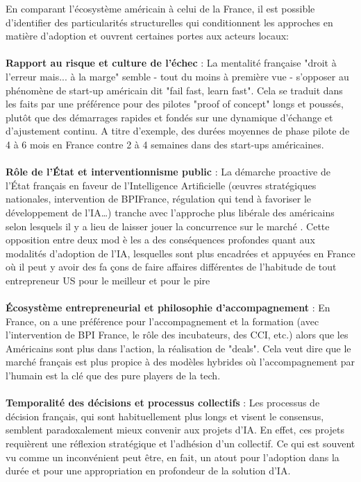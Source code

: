 En comparant l'écosystème américain à celui de la France, il est possible d'identifier des particularités structurelles qui conditionnent les approches en matière d'adoption et ouvrent certaines portes aux acteurs locaux:
\\\\
\textbf{Rapport au risque et culture de l'échec} : La mentalité française "droit à l'erreur mais... à la marge" semble - tout du moins à première vue - s'opposer au phénomène de start-up américain dit "fail fast, learn fast"\cite{meyer2014culture}. Cela se traduit dans les faits par une préférence pour des pilotes "proof of concept" longs et poussés, plutôt que des démarrages rapides et fondés sur une dynamique d'échange et d'ajustement continu. A titre d'exemple, des durées moyennes de phase pilote de 4 à 6 mois en France contre 2 à 4 semaines dans des start-ups américaines.
\\\\
\textbf{Rôle de l'État et interventionnisme public} : La démarche proactive de l’État français en faveur de l’Intelligence Artificielle (œuvres stratégiques nationales, intervention de BPIFrance, régulation qui tend à favoriser le développement de l’IA…) tranche avec l’approche plus libérale des américains selon lesquels il y a lieu de laisser jouer la concurrence sur le marché \cite{france_strategie2025make}. Cette opposition entre deux mod è les a des conséquences profondes quant aux modalités d’adoption de l’IA, lesquelles sont plus encadrées et appuyées en France où il peut y avoir des fa çons de faire affaires différentes de l’habitude de tout entrepreneur US pour le meilleur et pour le pire
\\\\
\textbf{Écosystème entrepreneurial et philosophie d'accompagnement} : En France, on a une préférence pour l'accompagnement et la formation (avec l'intervention de BPI France, le rôle des incubateurs, des CCI, etc.) alors que les Américains sont plus dans l'action, la réalisation de "deals". Cela veut dire que le marché français est plus propice à des modèles hybrides où l'accompagnement par l'humain est la clé que des pure players de la tech.
\\\\
\textbf{Temporalité des décisions et processus collectifs} : Les processus de décision français, qui sont habituellement plus longs et visent le consensus, semblent paradoxalement mieux convenir aux projets d’IA. En effet, ces projets requièrent une réflexion stratégique et l’adhésion d’un collectif. Ce qui est souvent vu comme un inconvénient peut être, en fait, un atout pour l’adoption dans la durée et pour une appropriation en profondeur de la solution d’IA.

